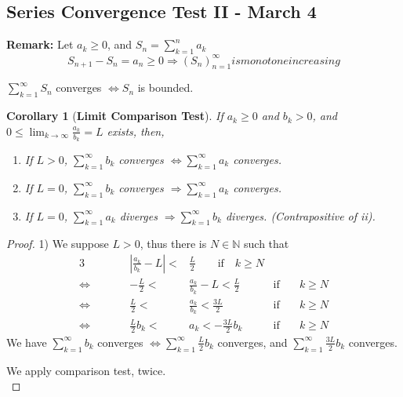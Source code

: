 \documentclass[12pt]{article}
\theoremstyle{plain}
\newtheorem{corollary}{Corollary}[subsection]
\newcommand{\abs}[1]{\left| #1 \right|}
\newcommand{\mN}{{\mathbb{N}}}
\begin{document}
\newpage
\subsection{Series Convergence Test II - March 4}


\textbf{Remark:}
Let $a_k \geq 0$, and $S_n = \sum_{k=1}^n a_k$ 
\[
	S_{n+1} - S_n = a_n \geq 0 \Rightarrow (S_n)_{n=1}^{\infty} is 
	monotone increasing
\]

$\sum_{k=1}^{\infty} S_n$ converges $\Leftrightarrow S_n$ is bounded. 

\begin{corollary}[\textbf{Limit Comparison Test}]
	If $a_k \geq 0$ and $b_k > 0$, and $0 \leq \lim_{k\to \infty} 
	\frac{a_k}{b_k} = L$ exists, then, 
	\begin{enumerate}
		\item If $L > 0$, $\sum_{k=1}^{\infty} b_k$ converges $\Leftrightarrow
			\sum_{k=1}^{\infty} a_k$ converges. 
		\item If $L = 0$, $\sum_{k=1}^{\infty} b_k$ converges $\Rightarrow
			\sum_{k=1}^{\infty} a_k$ converges. 
		\item If $L = 0$, $\sum_{k=1}^{\infty} a_k$ diverges $\Rightarrow
			\sum_{k=1}^{\infty} b_k$ diverges. (Contrapositive of ii). 
	\end{enumerate}
\end{corollary}
\begin{proof}
	1) We suppose $L > 0$, thus there is $N \in \mN$ such that
	\begin{alignat*}{3}
		& & 
		\abs{\frac{a_k}{b_k} - L } <& \frac L2 \qquad \text{if} \quad k \geq N\\
		\Leftrightarrow & \qquad &
		-\frac L2 <& \frac{a_k}{b_k} - L < \frac L2 
		\qquad&  \text{if} &\quad k \geq N\\
		\Leftrightarrow & \qquad & 
		\frac L2 <& \frac{a_k}{b_k} < \frac{3L}2
		\qquad&  \text{if}& \quad k \geq N\\
		\Leftrightarrow & \qquad & 
		\frac{L}2 b_k <& a_k < -\frac{3L}2 b_k 
		\qquad& \text{if} & \quad k \geq N 
	\end{alignat*}
	We have $\sum_{k=1}^{\infty} b_k$  converges
	$\Leftrightarrow \sum_{k=1}^{\infty} \frac L2b_k$ converges, and 
	$\sum_{k=1}^{\infty} \frac{3L}2 b_k$ converges.  
	
	We apply comparison test, twice. \\
\end{proof}
\end{document}
